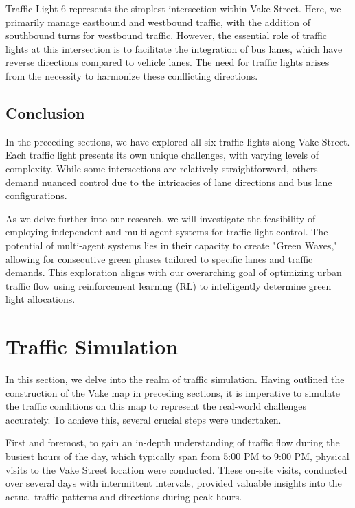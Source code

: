 Traffic Light 6 represents the simplest intersection within Vake Street. Here, we primarily manage eastbound and westbound traffic, with the addition of southbound turns for westbound traffic. However, the essential role of traffic lights at this intersection is to facilitate the integration of bus lanes, which have reverse directions compared to vehicle lanes. The need for traffic lights arises from the necessity to harmonize these conflicting directions.

\subsection{Conclusion}
In the preceding sections, we have explored all six traffic lights along Vake Street. Each traffic light presents its own unique challenges, with varying levels of complexity. While some intersections are relatively straightforward, others demand nuanced control due to the intricacies of lane directions and bus lane configurations.

As we delve further into our research, we will investigate the feasibility of employing independent and multi-agent systems for traffic light control. The potential of multi-agent systems lies in their capacity to create "Green Waves," allowing for consecutive green phases tailored to specific lanes and traffic demands. This exploration aligns with our overarching goal of optimizing urban traffic flow using reinforcement learning (RL) to intelligently determine green light allocations.

\section{Traffic Simulation} \label{sec:traffic-simulation}

In this section, we delve into the realm of traffic simulation. Having outlined the construction of the Vake map in preceding sections, it is imperative to simulate the traffic conditions on this map to represent the real-world challenges accurately. To achieve this, several crucial steps were undertaken.

First and foremost, to gain an in-depth understanding of traffic flow during the busiest hours of the day, which typically span from 5:00 PM to 9:00 PM, physical visits to the Vake Street location were conducted. These on-site visits, conducted over several days with intermittent intervals, provided valuable insights into the actual traffic patterns and directions during peak hours.

